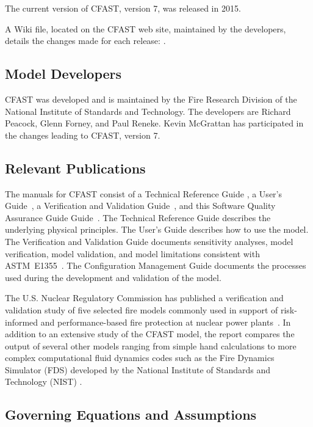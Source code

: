 \documentclass[11pt]{book}
\begin{document}
The current version of CFAST, version 7, was released in 2015.

A Wiki file, located on the CFAST web site, maintained by the developers, details the changes made for each release: \href{https://github.com/firemodels/cfast/wiki/Release-Notes}{}.


\subsection{Model Developers}

CFAST was developed and is maintained by the Fire Research Division of the National Institute of Standards and Technology. The developers are Richard Peacock, Glenn Forney, and Paul Reneke. Kevin McGrattan has participated in the changes leading to CFAST, version 7.

\subsection{Relevant Publications}

The manuals for CFAST consist of a Technical Reference Guide \cite{CFAST_Tech_Guide_7}, a User's Guide~\cite{CFAST_Users_Guide_7}, a Verification and Validation Guide~\cite{CFAST_Valid_Guide_7}, and this Software Quality Assurance Guide Guide~\cite{SQA_Guide}.  The Technical Reference Guide describes the underlying physical principles. The User's Guide describes how to use the model. The Verification and Validation Guide documents sensitivity analyses, model verification, model validation, and model limitations consistent with ASTM~E1355~\cite{ASTM:E1355}. The Configuration Management Guide documents the processes used during the development and validation of the model.

The U.S. Nuclear Regulatory Commission has published a verification and validation study of five selected fire models commonly used in support of risk-informed and performance-based fire protection at nuclear power plants~\cite{NRCNUREG1824}. In addition to an extensive study of the CFAST model, the report compares the output of several other models ranging from simple hand calculations to more complex computational fluid dynamics codes such as the Fire Dynamics Simulator (FDS) developed by the National Institute of Standards and Technology (NIST) \cite{FDS_Tech_Guide_6}.


\subsection{Governing Equations and Assumptions}
\end{document}

